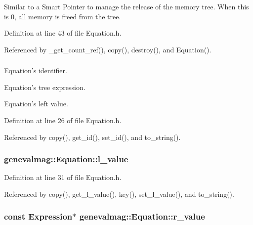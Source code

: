 Similar to a Smart Pointer to manage the release of the memory tree. When this is 0, all memory is freed from the tree. 



Definition at line 43 of file Equation.h.

Referenced by \_\-get\_\-count\_\-ref(), copy(), destroy(), and Equation().\hypertarget{classgenevalmag_1_1Equation_bcf149aeb80efa3ccb5c41886570e215}{
\subsubsection[{eq\_\-id}]{}}
\label{classgenevalmag_1_1Equation_bcf149aeb80efa3ccb5c41886570e215}


Equation's identifier. 

Equation's tree expression.

Equation's left value. 

Definition at line 26 of file Equation.h.

Referenced by copy(), get\_\-id(), set\_\-id(), and to\_\-string().\hypertarget{classgenevalmag_1_1Equation_f6dfdfddb6eff2b61a359ff5d58c5144}{
\subsubsection[{l\_\-value}]{ {\bf genevalmag::Equation::l\_\-value}}}
\label{classgenevalmag_1_1Equation_f6dfdfddb6eff2b61a359ff5d58c5144}




Definition at line 31 of file Equation.h.

Referenced by copy(), get\_\-l\_\-value(), key(), set\_\-l\_\-value(), and to\_\-string().\hypertarget{classgenevalmag_1_1Equation_bdc49df03becf19ea7f5aa1b89b749c0}{
\subsubsection[{r\_\-value}]{\setlength{\rightskip}{0pt plus 5cm}const {\bf Expression}$\ast$ {\bf genevalmag::Equation::r\_\-value}}}
\label{classgenevalmag_1_1Equation_bdc49df03becf19ea7f5aa1b89b749c0}




